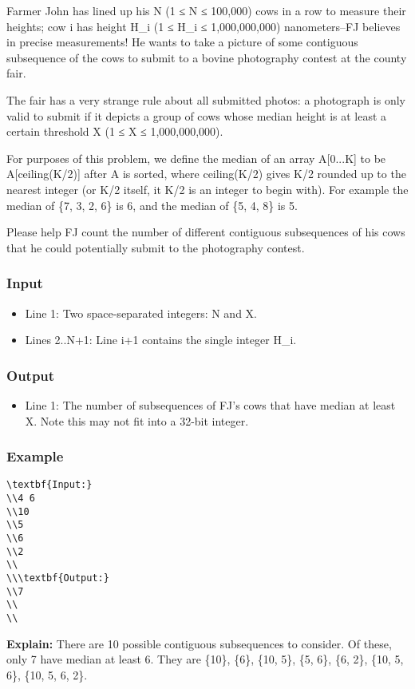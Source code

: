



    Farmer John has lined up his N (1 ≤ N ≤ 100,000) cows in a row to measure their heights; cow i has height H\_i (1 ≤ H\_i ≤ 1,000,000,000) nanometers--FJ believes in precise measurements! He wants to take a picture of some contiguous subsequence of the cows to submit to a bovine photography contest at the county fair.   

    The fair has a very strange rule about all submitted photos: a photograph is only valid to submit if it depicts a group of cows whose median height is at least a certain threshold X (1 ≤ X ≤ 1,000,000,000).   

    For purposes of this problem, we define the median of an array A[0...K] to be A[ceiling(K/2)] after A is sorted, where ceiling(K/2) gives K/2 rounded  up to the nearest integer (or K/2 itself, it K/2 is an integer to begin with). For example the median of \{7, 3, 2, 6\} is 6, and the median of \{5, 4, 8\} is 5.   

    Please help FJ count the number of different contiguous subsequences of his cows that he could potentially submit to the photography contest.   

\subsubsection{   Input  }
\begin{itemize}
	\item      Line 1: Two space-separated integers: N and X.    
	\item      Lines 2..N+1: Line i+1 contains the single integer H\_i.    
\end{itemize}

\subsubsection{   Output  }
\begin{itemize}
	\item      Line 1: The number of subsequences of FJ's cows that have median at         least X. Note this may not fit into a 32-bit integer.    
\end{itemize}

\subsubsection{   Example  }
\begin{verbatim}
\textbf{Input:}
\\4 6 
\\10 
\\5 
\\6 
\\2 
\\
\\\textbf{Output:}
\\7 
\\
\\\end{verbatim}

\textbf{     Explain:    }    There are 10 possible contiguous subsequences to consider. Of these, only 7 have median at least 6. They are \{10\}, \{6\}, \{10, 5\}, \{5, 6\}, \{6, 2\}, \{10, 5, 6\}, \{10, 5, 6, 2\}.   